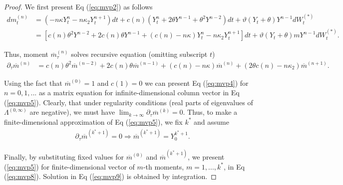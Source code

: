 \documentclass[11pt,a4paper] {article}
\begin{document}
\begin{proof}
We first present Eq (\ref{eq:mvp2}) as follows
\begin{equation*}
\begin{split}
dm^{(n)}_{t}& =  \left(- n\kappa Y^{n}_{t}   - n\kappa_{2}Y^{n+1}_{t}\right)dt +c(n) \left(Y^{n}_{t}+2\theta Y^{n-1}+\theta^{2}Y^{n-2}\right)dt  + \vartheta \left(Y_{t}+\theta\right)Y^{n-1} dW^{(*)}_{t}\\
& =  \left[c(n)\theta^{2}Y^{n-2}+ 2c(n)\theta Y^{n-1} + (c(n)- n\kappa) Y^{n}_{t}  - n\kappa_{2}Y^{n+1}_{t}\right]dt   + \vartheta \left(Y_{t}+\theta\right)mY^{n-1} dW^{(*)}_{t}.
\end{split}
\end{equation*}


Thus, moment $\overline{m}^{(n)}_{\tau}$ solves recursive equation (omitting subscript $t$)
\begin{equation} \label {eq:mvp4}
\begin{split}
\partial_{\tau}\overline{m}^{(n)}& =  c(n)\theta^{2}\overline{m}^{(n-2)}+ 2c(n)\theta \overline{m}^{(n-1)}+  (c(n)- n\kappa )\overline{m}^{(n)}  + (2\theta c(n)- n\kappa_{2})\overline{m}^{(n+1)}.
\end{split}
\end{equation}

Using the fact that $\overline{m}^{(0)}=1$ and $c(1)=0$ we can present Eq (\ref{eq:mvp4}) for $n=0,1,...$ as a matrix equation for infinite-dimensional column vector in Eq (\ref{eq:mvp5}). Clearly, that under regularity conditions (real parts of eigenvalues of $\Lambda^{(0,\infty)}$ are negative), we must have $\lim_{k\rightarrow \infty} \partial_{\tau}\overline{m}^{(k)} = 0$. Thus, to make a finite-dimensional approximation of Eq (\ref{eq:mvp5}), we fix $k^{*}$ and assume
\begin{equation} \label {eq:mvp7}
\begin{split}
& \partial_{\tau}\overline{m}^{(k^{*}+1)}=0  \Rightarrow \overline{m}^{(k^{*}+1)} = Y^{k^{*}+1}_{0}.
\end{split}
\end{equation}

Finally, by substituting fixed values for $\overline{m}^{(0)}$ and $\overline{m}^{(k^{*}+1)}$, we present (\ref{eq:mvp5}) for finite-dimensional vector of $m$-th moments, $m=1,...,k^{*}$, in Eq (\ref{eq:mvp8}). Solution in Eq (\ref{eq:mvp9}) is obtained by integration.
\end{proof}
\end{document}
